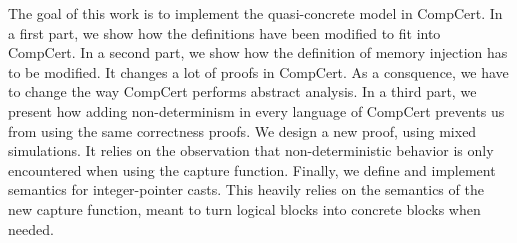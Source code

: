 The goal of this work is to implement the quasi-concrete model in CompCert.
In a first part, we show how the definitions have been modified to fit into CompCert.
In a second part, we show how the definition of memory injection has to be modified. It changes a lot of proofs in CompCert. As a consquence, we have to change the way CompCert performs abstract analysis.
In a third part, we present how adding non-determinism in every language of CompCert prevents us from using the same correctness proofs. We design a new proof, using mixed simulations. It relies on the observation that non-deterministic behavior is only encountered when using the capture function.
Finally, we define and implement semantics for integer-pointer casts. This heavily relies on the semantics of the new capture function, meant to turn logical blocks into concrete blocks when needed.
